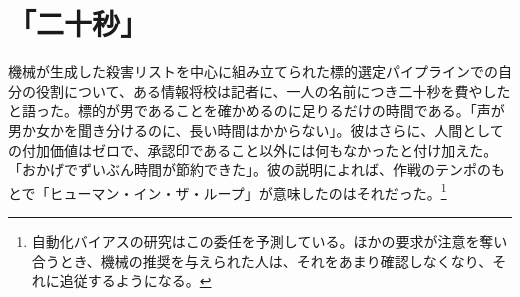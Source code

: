 \chapter{「二十秒」}
\label{sec:1}
機械が生成した殺害リストを中心に組み立てられた標的選定パイプラインでの自分の役割について、ある情報将校は記者に、一人の名前につき二十秒を費やしたと語った。標的が男であることを確かめるのに足りるだけの時間である。「声が男か女かを聞き分けるのに、長い時間はかからない」。彼はさらに、人間としての付加価値はゼロで、承認印であること以外には何もなかったと付け加えた。「おかげでずいぶん時間が節約できた」\autocite{abraham2024lavender}。彼の説明によれば、作戦のテンポのもとで「ヒューマン・イン・ザ・ループ」が意味したのはそれだった。\footnote{自動化バイアスの研究はこの委任を予測している。ほかの要求が注意を奪い合うとき、機械の推奨を与えられた人は、それをあまり確認しなくなり、それに追従するようになる\autocite{parasuraman2010complacency}。}

